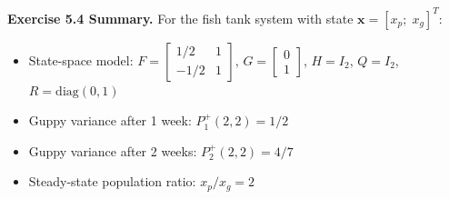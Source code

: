 \documentclass[12pt]{article}
\begin{document}
\begin{resultsbox}

\textbf{Exercise 5.4 Summary.} For the fish tank system with state $\mathbf{x} = [x_p;\; x_g]^T$:
\begin{itemize}[nosep]
\item State-space model: $F = \begin{bmatrix} 1/2 & 1 \\ -1/2 & 1 \end{bmatrix}$, $G = \begin{bmatrix} 0 \\ 1 \end{bmatrix}$, $H = I_2$, $Q = I_2$, $R = \text{diag}(0, 1)$
\item Guppy variance after 1 week: $P_1^+(2,2) = 1/2$
\item Guppy variance after 2 weeks: $P_2^+(2,2) = 4/7$
\item Steady-state population ratio: $x_p / x_g = 2$
\end{itemize}

\end{resultsbox}
\end{document}
